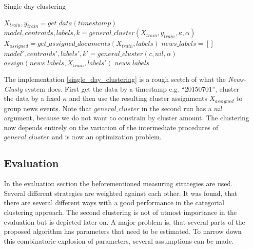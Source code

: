     \begin{algorithm}[H]
    \begin{algorithmic}[1]
      \caption{Single day clustering}\label{single_day_clustering}
        \State $X_{train},y_{train} = get\_data(timestamp)$
        \State $model,centroids,labels,k = general\_cluster(X_{train},y_{train},\kappa,\alpha)$
        \State $X_{assigned} = get\_assigned\_documents(X_{train},labels)$
        \State $news\_labels = []$
          \State $model',centroids',labels',k' = general\_cluster(c,nil,\alpha)$
          \State $assign(news\_labels, X_{train}, labels')$
        \EndFor
        \State \Return $news\_labels$
    \end{algorithmic}
    \end{algorithm}

  The implementation \ref{single_day_clustering} is a rough scetch of what the \emph{News-Clusty} system does. First get the data by a timestamp e.g. ``20150701'', cluster the data by a fixed $\kappa$ and then use the resulting cluster assignments $X_{assigned}$ to group news events. Note that $general\_cluster$ in the second run has a $nil$ argument, because we do not want to constrain by cluster amount. The clustering now depends entirely on the variation of the intermediate procedures of $general\_cluster$ and is now an optimization problem. 

  \subsection{Evaluation}
  In the evaluation section the beforementioned measuring strategies are used. Several different strategies are weighted against each other. It was found, that there are several different ways with a good performance in the categorial clustering approach. The second clustering is not of utmost importance in the evaluation but is depicted later on. A major problem is, that several parts of the proposed algorithm has parameters that need to be estimated. To narrow down this combinatoric explosion of parameters, several assumptions can be made.

